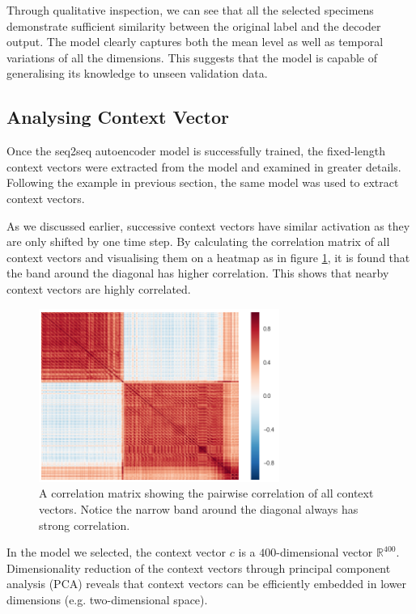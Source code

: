 \documentclass[11pt]{article} %
\theoremstyle{plain}
\theoremstyle{definition}
\begin{document}
Through qualitative inspection, we can see that all the selected specimens demonstrate sufficient similarity between the original label and the decoder output. The model clearly captures both the mean level as well as temporal variations of all the dimensions. This suggests that the model is capable of generalising its knowledge to unseen validation data.

\subsection{Analysing Context Vector}

Once the seq2seq autoencoder model is successfully trained, the fixed-length context vectors were extracted from the model and examined in greater details. Following the example in previous section, the same model was used to extract context vectors. 

As we discussed earlier, successive context vectors have similar activation as they are only shifted by one time step. By calculating the correlation matrix of all context vectors and visualising them on a heatmap as in figure \ref{fig:matrix}, it is found that the band around the diagonal has higher correlation. This shows that nearby context vectors are highly correlated.

\begin{figure}[H]
	\centering
	\includegraphics[width=0.7\textwidth]{matrix.PNG}
	\caption{A correlation matrix showing the pairwise correlation of all context vectors. Notice the narrow band around the diagonal always has strong correlation.}
	\label{fig:matrix}
\end{figure}

In the model we selected, the context vector \(c\) is a \(400\)-dimensional vector \(\mathbb{R}^{400}\). Dimensionality reduction of the context vectors through principal component analysis (PCA) reveals that context vectors can be efficiently embedded in lower dimensions (e.g. two-dimensional space). 
\end{document}
